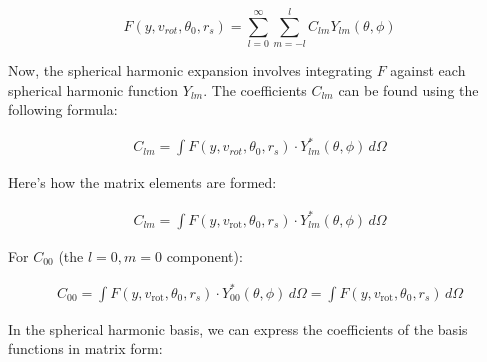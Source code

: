 \documentclass[modern]{aastex631}
\begin{document}
\begin{equation}
    F(y, v_{rot}, \theta_0, r_s) = \sum_{l=0}^{\infty} \sum_{m=-l}^{l} C_{lm} Y_{lm}(\theta, \phi) 
\end{equation}



Now, the spherical harmonic expansion involves integrating \( F \) against each spherical harmonic function \( Y_{lm} \). 
The coefficients \( C_{lm} \) can be found using the following formula:

\begin{linenomath}\begin{align}
    C_{lm} = \int F(y, v_{rot}, \theta_0, r_s) \cdot Y_{lm}^*(\theta, \phi) \, d\Omega 
\end{align}\end{linenomath}

Here's how the matrix elements are formed:

\begin{linenomath}\begin{align}
C_{lm} = \int F(y, v_{\text{rot}}, \theta_0, r_s) \cdot Y_{lm}^*(\theta, \phi) \, d\Omega 
\end{align}\end{linenomath}

For \( C_{00} \) (the \( l = 0, m = 0 \) component):

\begin{linenomath}\begin{align}
    C_{00} = \int F(y, v_{\text{rot}}, \theta_0, r_s) \cdot Y_{00}^*(\theta, \phi) \, d\Omega = \int F(y, v_{\text{rot}}, \theta_0, r_s) \, d\Omega 
\end{align}\end{linenomath}


In the spherical harmonic basis, we can express the coefficients of the basis functions in matrix form:
\end{document}
